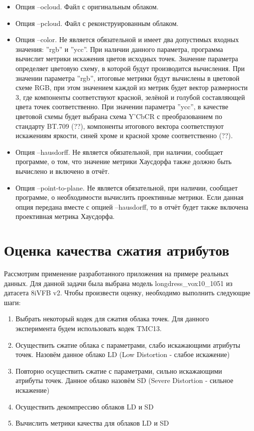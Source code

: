 \begin{itemize}
    \item Опция --ocloud. Файл с оригинальным облаком.
    \item Опция --pcloud. Файл с реконструированным облаком.
    \item Опция --color. Не является обязательной и имеет два допустимых входных
    значения: ''rgb'' и ''ycc''. При наличии данного параметра, программа
    вычислит метрики искажения цветов исходных точек. Значение параметра
    определяет цветовую схему, в которой будут производится вычисления. При
    значении параметра ''rgb'', итоговые метрики будут вычислены в цветовой
    схеме RGB, при этом значением каждой из метрик будет вектор размерности 3,
    где компоненты соответствуют красной, зелёной и голубой составляющей цвета
    точек соответственно. При значении параметра ''ycc'', в качестве цветовой
    схемы будет выбрана схема Y'CbCR с преобразованием по стандарту BT.709 (??),
    компоненты итогового вектора соответствуют искажениям яркости, синей хроме и
    красной хроме соответственно (??).
    \item Опция --hausdorff. Не является обязательной, при наличии, сообщает
    программе, о том, что значение метрики Хаусдорфа также должно быть вычислено
    и включено в отчёт.
    \item Опция --point-to-plane. Не является обязательной, при наличии,
    сообщает программе, о необходимости вычислить проективные метрики. Если
    данная опция передана вместе с опцией --hausdorff, то в отчёт будет также
    включена проективная метрика Хаусдорфа.
\end{itemize}


\section{Оценка качества сжатия атрибутов}

Рассмотрим применение разработанного приложения на примере реальных данных. Для
данной задачи была выбрана модель longdress\_vox10\_1051 из датасета 8iVFB
v2\cite{LongdressDataset}. Чтобы произвести оценку, необходимо выполнить
следующие шаги:

\begin{enumerate}
    \item Выбрать некоторый кодек для сжатия облака точек. Для данного
    эксперимента будем использовать кодек TMC13.
    \item Осуществить сжатие облака с параметрами, слабо искажающими атрибуты
    точек. Назовём данное облако LD (Low Distortion - слабое искажение)
    \item Повторно осуществить сжатие с параметрами, сильно искажающими атрибуты
    точек. Данное облако назовём SD (Severe Distortion - сильное искажение)
    \item Осуществить декомпрессию облаков LD и SD
    \item Вычислить метрики качества для облаков LD и SD
\end{enumerate}

